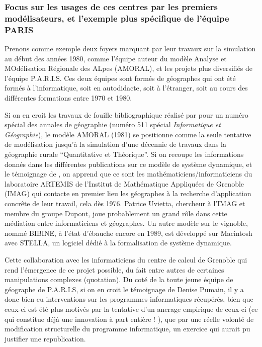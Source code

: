 


\subsubsection{Focus sur les usages de ces centres par les premiers modélisateurs, et l'exemple plus spécifique de l'équipe PARIS}
\label{sssec:contexte_modelisateur}

Prenons comme exemple deux foyers marquant par leur travaux sur la simulation au début des années 1980, comme l’équipe auteur du modèle Analyse et MOdélisation Régionale des ALpes (AMORAL), et les projets plus diversifiés de l’équipe P.A.R.I.S. Ces deux équipes sont formés de géographes qui ont été formés à l’informatique, soit en autodidacte, soit à l'étranger, soit au cours des différentes formations entre 1970 et 1980.

Si on en croit les travaux de fouille bibliographique réalisé par \textcite{Rey1983} pour un numéro  spécial des annales de géographie (numéro 511 spécial \textit{Informatique et Géographie}), le modèle AMORAL (1981) se positionne comme la seule tentative de modélisation jusqu'à la simulation d'une décennie de travaux dans la géographie rurale \enquote{Quantitative et Théorique}. Si on recoupe les informations donnés dans les différentes publications sur ce modèle de système dynamique, et le témoignage de \textcite{LeBerre1987}, on apprend que ce sont les mathématiciens/informaticiens du laboratoire ARTEMIS de l’Institut de Mathématique Appliquées de Grenoble (IMAG) qui contacte en premier lieu les géographes à la recherche d’application concrête de leur travail, cela dès 1976. Patrice Uvietta, chercheur à l'IMAG et membre du groupe Dupont, joue probablement un grand rôle dans cette médiation entre informaticiens et géographes. Un autre modèle sur le vignoble, nommé BIBINE, à l'état d'ébauche encore en 1989, est développé sur Macintosh avec STELLA, un logiciel dédié à la formalisation de système dynamique. \autocite{Chamussy1989}

Cette collaboration avec les informaticiens du centre de calcul de Grenoble qui rend l’émergence de ce projet possible, du fait entre autres de certaines manipulations complexes (quotation). Du coté de la toute jeune équipe de géographe de P.A.R.I.S, si on en croit le témoignage de Denise Pumain, il y a donc bien eu interventions sur les programmes informatiques récupérés, bien que ceux-ci est été plus motivés par la tentative d’un ancrage empirique de ceux-ci (ce qui constitue déjà une innovation à part entière ! \autocite{Pumain1982} ), que par une réelle volonté de modification structurelle du programme informatique, un exercice qui aurait pu justifier une republication.

